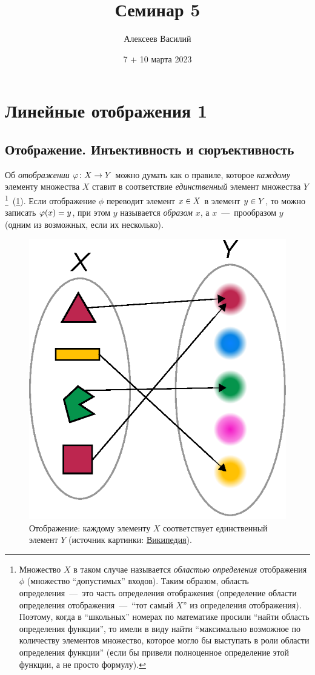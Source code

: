 \documentclass[a4paper,12pt]{article}
\author{Алексеев Василий}
\title{Семинар 5}
\date{7 + 10 марта 2023}
\begin{document}
  \maketitle
  
  \tableofcontents

  \thispagestyle{empty}
  
  \newpage
  


  \section{Линейные отображения 1}
  
  \subsection{Отображение. Инъективность и сюръективность}
  
  Об \emph{отображении} $\phi\colon X \hm\to Y$ можно думать как о правиле, которое \emph{каждому} элементу множества $X$ ставит в соответствие \emph{единственный} элемент множества $Y$\footnote{Множество $X$ в таком случае называется \emph{областью определения} отображения $\phi$ (множество ``допустимых'' входов). Таким образом, область определения~---~это часть определения отображения (определение области определения отображения~---~``тот самый $X$'' из определения отображения). Поэтому, когда в ``школьных'' номерах по математике просили ``найти область определения функции'', то имели в виду найти ``максимально возможное по количеству элементов множество, которое могло бы выступать в роли области определения функции'' (если бы привели полноценное определение этой функции, а не просто формулу).}~(\ref{fig:function}).
  Если отображение $\phi$ переводит элемент $x \hm\in X$ в элемент $y \hm\in Y$, то можно записать $\phi(x) \hm= y$, при этом $y$ называется \emph{образом} $x$, а $x$~---~прообразом $y$ (одним из возможных, если их несколько).
  
  \begin{figure}[h]
    \centering
  
    \includegraphics[width=0.3\columnwidth]{function}
  
    \caption{Отображение: каждому элементу $X$ соответствует единственный элемент $Y$ (источник картинки: \href{https://en.wikipedia.org/wiki/Function\_(mathematics)\#/media/File:Function_color_example_3.svg}{Википедия}).}
    \label{fig:function}
  \end{figure}
  
\end{document}
